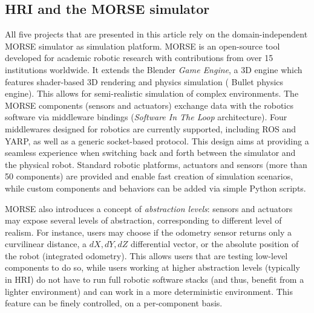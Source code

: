 \documentclass{llncs}
\begin{document}
\subsection*{HRI and the MORSE simulator}

All five projects that are presented in this article rely on the
domain-independent MORSE simulator as simulation platform. MORSE is an
open-source tool developed for academic robotic research with contributions from
over 15 institutions worldwide. It extends the Blender \emph{Game Engine}, a 3D
engine which features shader-based 3D rendering and physics simulation ({\sc
Bullet} physics engine). This allows for semi-realistic simulation of complex
environments. The MORSE components (sensors and actuators) exchange data with
the robotics software via middleware bindings (\emph{Software In The Loop}
architecture).  Four middlewares designed for robotics are currently supported,
including ROS and YARP, as well as a generic socket-based protocol. This design
aims at providing a seamless experience when switching back and forth between
the simulator and the physical robot. Standard robotic platforms, actuators and
sensors (more than 50 components) are provided and enable fast creation of
simulation scenarios, while custom components and behaviors can be added via
simple Python scripts.


MORSE also introduces a concept of \emph{abstraction levels}: sensors and actuators
may expose several levels of abstraction, corresponding to different level of
realism. For instance, users may choose if the odometry sensor returns only a
curvilinear distance, a $dX, dY, dZ$ differential vector, or the absolute
position of the robot (integrated odometry). This allows users that are testing
low-level components to do so, while users working at higher abstraction
levels (typically in HRI) do not have to run full robotic software stacks (and
thus, benefit from a lighter environment) and can work in a more deterministic
environment. This feature can be finely controlled, on a per-component basis.
\end{document}
